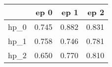 \begin{tabular}{lrrr}
\toprule
{} &   ep 0 &   ep 1 &   ep 2 \\
\midrule
hp\_0 &  0.745 &  0.882 &  0.831 \\
hp\_1 &  0.758 &  0.746 &  0.781 \\
hp\_2 &  0.650 &  0.770 &  0.810 \\
\bottomrule
\end{tabular}
